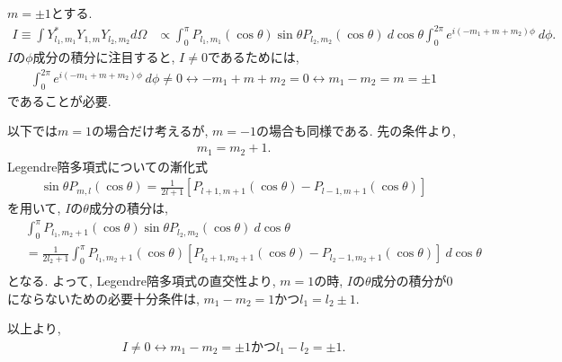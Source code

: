 \begin{ex}
    \label{ex7.16}
    $m=\pm1$とする.
    \begin{align*}
        I \equiv \int Y_{l_1,m_1}^* Y_{1,m} Y_{l_2,m_2} d\Omega
         & \propto
        \int_{0}^\pi P_{l_1,m_1}(\cos \theta) \sin\theta P_{l_2,m_2}(\cos \theta) \ d\cos\theta
        \int_{0}^{2\pi} e^{i(-m_1+m+m_2)\phi}\ d\phi.
    \end{align*}
    $I$の$\phi$成分の積分に注目すると, $I \neq 0$であるためには,
    \begin{align*}
        \int_{0}^{2\pi} e^{i(-m_1+m+m_2)\phi}\ d\phi \neq 0
        \longleftrightarrow
        -m_1 + m + m_2 = 0
        \longleftrightarrow
        m_1 - m_2 = m = \pm1
    \end{align*}
    であることが必要.
    \par
    以下では$m=1$の場合だけ考えるが, $m=-1$の場合も同様である. 先の条件より,
    \begin{align*}
        m_1 = m_2 +1.
    \end{align*}
    Legendre陪多項式についての漸化式
    \begin{align*}
        \sin\theta P_{m,l}(\cos\theta)
        = \frac{1}{2l +1}\left[P_{l+1,m+1}(\cos \theta) - P_{l-1,m+1}(\cos\theta)\right]
    \end{align*}
    を用いて, $I$の$\theta$成分の積分は,
    \begin{align*}
           & \int_{0}^\pi P_{l_1,m_2 + 1}(\cos \theta) \sin\theta P_{l_2,m_2}(\cos \theta) \ d\cos\theta \\
        \  & =
        \frac{1}{2 l_2 + 1}\int_{0}^\pi P_{l_1,m_2+1}(\cos \theta)
        \left[P_{l_2+1,m_2+1}(\cos \theta) - P_{l_2-1,m_2+1}(\cos\theta)\right]
        \ d\cos\theta                                                                                    \\
    \end{align*}
    となる. よって, Legendre陪多項式の直交性より, $m=1$の時, $I$の$\theta$成分の積分が$0$にならないための必要十分条件は, $m_1 - m_2 = 1$かつ$l_1 = l_2 \pm 1$.
    \par
    以上より,
    \begin{align*}
        I \neq 0 \longleftrightarrow m_1 - m_2 = \pm 1 \mathrm{かつ} l_1 - l_2 = \pm1.
    \end{align*}
\end{ex}

